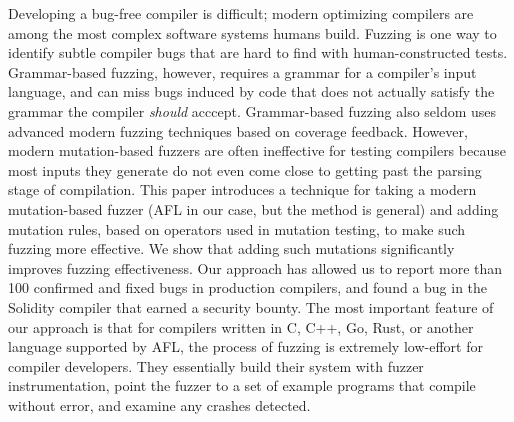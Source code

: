 Developing a bug-free compiler is difficult; modern optimizing compilers are among the most complex software systems humans build.  Fuzzing is one way to identify subtle compiler bugs that are hard to find with human-constructed tests.  Grammar-based fuzzing, however, requires a grammar for a compiler's input language, and can miss bugs induced by code that does not actually satisfy the grammar the compiler \emph{should} acccept.  Grammar-based fuzzing also seldom uses advanced modern fuzzing techniques based on coverage feedback.  However, modern mutation-based fuzzers are often ineffective for testing compilers because most inputs they generate do not even come close to getting past the parsing stage of compilation.   This paper introduces a technique for taking a modern mutation-based fuzzer (AFL in our case, but the method is general) and adding mutation rules, based on operators used in mutation testing, to make such fuzzing more effective.  We show that adding such mutations significantly improves fuzzing effectiveness.  Our approach has allowed us to report more than 100 confirmed and fixed bugs in production compilers, and found a bug in the Solidity compiler that earned a security bounty.  The most important feature of our approach is that for compilers written in C, C++, Go, Rust, or another language supported by AFL, the process of fuzzing is extremely low-effort for compiler developers.  They essentially build their system with fuzzer instrumentation, point the fuzzer to a set of example programs that compile without error, and examine any crashes detected.
